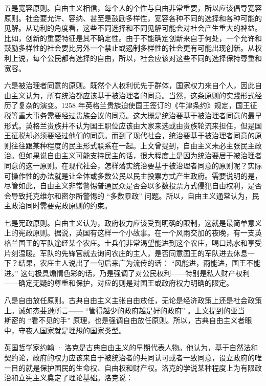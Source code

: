 五是宽容原则。自由主义相信，每个人的个性与自由非常重要，所以应该倡导宽容原则。社会要允许、容纳、甚至是鼓励多样性，宽容各种不同的选择和各种可能的见解。从功利的角度看，这些不同选择和不同见解可能会对社会产生重大的裨益。比如，创新的重要特征是其不确定性。由于不能确定创新来自于何处，一个允许和鼓励多样性的社会要比另外一个禁止或遏制多样性的社会更有可能出现创新。从权利上说，每个公民都有选择的自由，所以，社会应该对这些不同的选择保持尊重和宽容。

六是被治理者同意的原则。既然个人权利优先于群体，国家权力来自个人，因此自由主义认为，所有统治都应该基于被治理者的同意。当然，这条原则的实践形式经历了复杂的演变。1258 年英格兰贵族迫使国王签订的《牛津条约》规定，国王征税等重大事务需要经过贵族会议的同意。这大概是统治要基于被治理者同意的最早形式。英格兰贵族并不认为国王职位应该由大家来选或由贵族轮流来担任，但是国王征税却必须要经过他们的同意。而到了现代社会，统治要基于被治理者同意的原则往往跟某种程度的民主形式联系在一起。上文曾提到，自由主义未必主张民主政治。但如果说自由主义可能支持民主的话，很大程度上是因为统治要居于被治理者同意的这一原则。在现代社会，怎样落实统治要基于被治理者同意的原则呢？实际可操作性的办法就是让全体或多数公民以民主投票方式产生政府。需要说明的是，尽管如此，自由主义非常警惕普通民众是否会以多数投票方式侵犯自由权利，是否会导致托克维尔和密尔所警惕的 “多数暴政” 问题。所以，自由主义通常认为，民主政治同时需要宪政原则的约束。

七是宪政原则。自由主义认为，政府权力应该受到明确的限制，这就是最简单意义上的宪政原则。据说，英国有这样一个小故事。在一个风雨交加的夜晚，有一支英格兰国王的军队途经某个农庄。士兵们非常渴望能进到这个农庄，喝口热水和享受片刻温暖。军队的先锋官就去询问农庄的主人，是否同意国王的军队进去休息一下？结果，农庄主人说出了一句后来广为流传的话： “风能进，雨能进，国王不能进。” 这句极具煽情色彩的话，乃是强调了对公民权利——特别是私人财产权利——确定无疑的尊重和保护，对应的则是对国王或政府权力明确的限定。

八是自由放任原则。古典自由主义主张自由放任，无论是经济政策上还是社会政策上。诚如杰斐逊所言—— “管得越少的政府越是好的政府” 。上文提到的亚当 · 斯密的 “看不见的手” 原理，也是强调自由放任原则。所以，古典自由主义者眼中，守夜人国家就是理想的国家类型。


英国哲学家约翰 · 洛克是古典自由主义的早期代表人物。他认为，基于自然法和契约论，政府的权力应该来自于被统治者的共同认可或者一致同意，设立政府的唯一目的就是保护国民的生命权、自由权和财产权。洛克的学说某种程度上为有限政治和立宪主义奠定了理论基础。洛克说：


